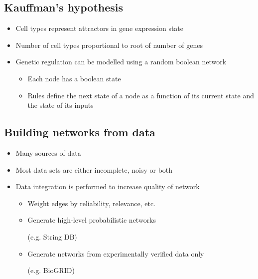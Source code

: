 \documentclass[a4paper]{article}
\begin{document}
\subsection{Kauffman's hypothesis}

\begin{itemize}
  \item
    Cell types represent attractors in gene expression state

  \item
    Number of cell types proportional to root of number of genes

  \item
    Genetic regulation can be modelled using a random boolean network

    \begin{itemize}
      \item
        Each node has a boolean state

      \item
        Rules define the next state of a node as a function of its current state
        and the state of its inputs
    \end{itemize}
\end{itemize}

\subsection{Building networks from data}

\begin{itemize}
  \item
    Many sources of data

  \item
    Most data sets are either incomplete, noisy or both

  \item
    Data integration is performed to increase quality of network

    \begin{itemize}
      \item
        Weight edges by reliability, relevance, etc.

      \item
        Generate high-level probabilistic networks

        (e.g. String DB)

      \item
        Generate networks from experimentally verified data only

        (e.g. BioGRID)
    \end{itemize}
\end{itemize}
\end{document}
